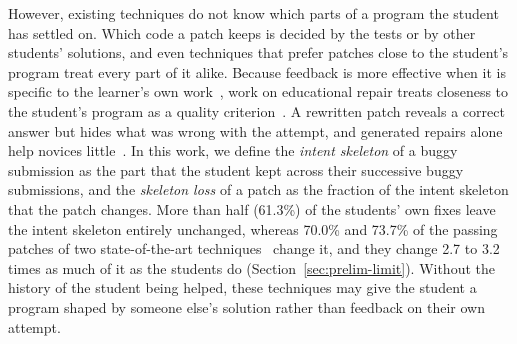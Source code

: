 \documentclass[10pt,conference]{IEEEtran}
\begin{document}
However, existing techniques do not know which parts of a program the student has settled on. Which code a patch keeps is decided by the tests or by other students' solutions, and even techniques that prefer patches close to the student's program treat every part of it alike. Because feedback is more effective when it is specific to the learner's own work~\cite{hattie2007power, shute2008focus}, work on educational repair treats closeness to the student's program as a quality criterion~\cite{koutcheme2023evaluating, koutcheme2025direct}. A rewritten patch reveals a correct answer but hides what was wrong with the attempt, and generated repairs alone help novices little~\cite{yi2017feasibility}. In this work, we define the \emph{intent skeleton} of a buggy submission as the part that the student kept across their successive buggy submissions, and the \emph{skeleton loss} of a patch as the fraction of the intent skeleton that the patch changes. More than half (61.3\%) of the students' own fixes leave the intent skeleton entirely unchanged, whereas 70.0\% and 73.7\% of the passing patches of two state-of-the-art techniques~\cite{hu2019re, dai2026learner} change it, and they change 2.7 to 3.2 times as much of it as the students do (Section~\ref{sec:prelim-limit}). Without the history of the student being helped, these techniques may give the student a program shaped by someone else's solution rather than feedback on their own attempt.
\end{document}
